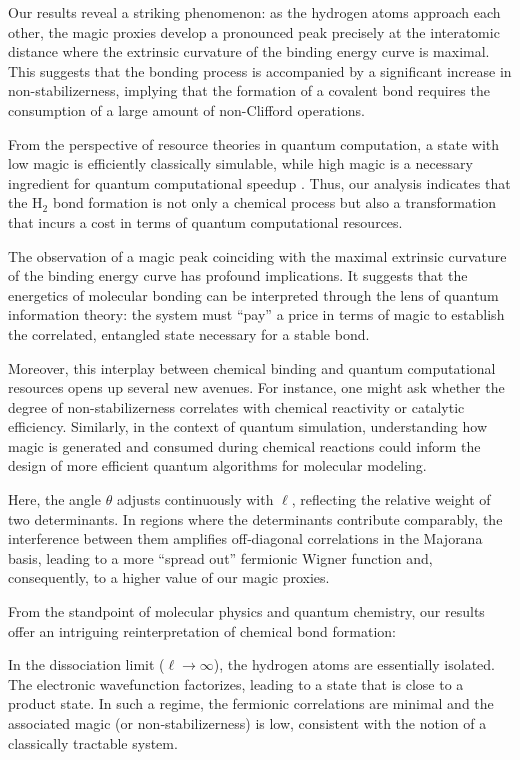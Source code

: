 \documentclass[aps,prl,twocolumn,groupedaddress, reprint,floatfix,nofootinbib,longbibliography]{revtex4-2}
\begin{document}
        Our results reveal a striking phenomenon: as the hydrogen atoms approach each other, the magic proxies develop a pronounced peak precisely at the interatomic distance where the extrinsic curvature of the binding energy curve is maximal. This suggests that the bonding process is accompanied by a significant increase in non-stabilizerness, implying that the formation of a covalent bond requires the consumption of a large amount of non-Clifford operations.

        From the perspective of resource theories in quantum computation, a state with low magic is efficiently classically simulable, while high magic is a necessary ingredient for quantum computational speedup \cite{howard2014contextuality,Veitch2014Resource}. Thus, our analysis indicates that the H$_2$ bond formation is not only a chemical process but also a transformation that incurs a cost in terms of quantum computational resources.

        The observation of a magic peak coinciding with the maximal extrinsic curvature of the binding energy curve has profound implications. It suggests that the energetics of molecular bonding can be interpreted through the lens of quantum information theory: the system must “pay” a price in terms of magic to establish the correlated, entangled state necessary for a stable bond.

        Moreover, this interplay between chemical binding and quantum computational resources opens up several new avenues. For instance, one might ask whether the degree of non-stabilizerness correlates with chemical reactivity or catalytic efficiency. Similarly, in the context of quantum simulation, understanding how magic is generated and consumed during chemical reactions could inform the design of more efficient quantum algorithms for molecular modeling.

        Here, the angle $\theta$ adjusts continuously with $\ell$, reflecting the relative weight of two determinants. In regions where the determinants contribute comparably, the interference between them amplifies off‑diagonal correlations in the Majorana basis, leading to a more “spread out” fermionic Wigner function and, consequently, to a higher value of our magic proxies.

        From the standpoint of molecular physics and quantum chemistry, our results offer an intriguing reinterpretation of chemical bond formation:

        In the dissociation limit ($\ell\to\infty$), the hydrogen atoms are essentially isolated. The electronic wavefunction factorizes, leading to a state that is close to a product state. In such a regime, the fermionic correlations are minimal and the associated magic (or non‑stabilizerness) is low, consistent with the notion of a classically tractable system.
\end{document}
